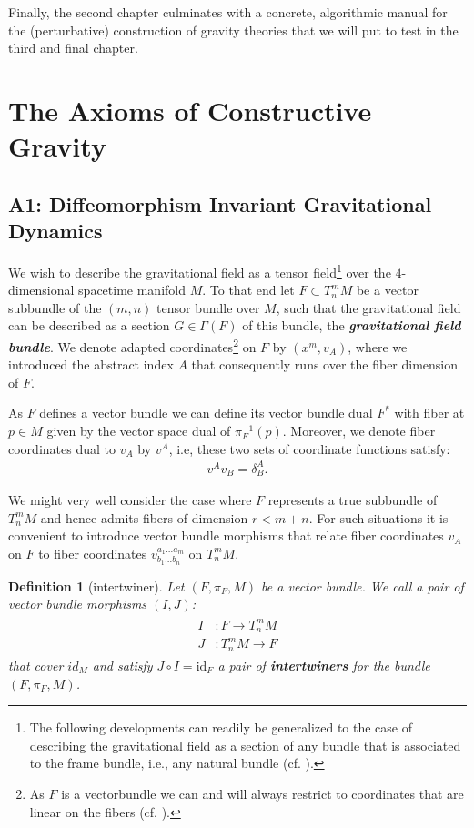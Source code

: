 \documentclass[%
 reprint,
nofootinbib,
 amsmath,amssymb,
 aps,
 prd,
floatfix,
]{revtex4-2}
\newtheorem{definition}{Definition}
\begin{document}
Finally, the second chapter culminates with a concrete, algorithmic manual for the (perturbative) construction of gravity theories that we will put to test in the third and final chapter.


\section{The Axioms of Constructive Gravity}\label{chapter1}
\subsection{A1: Diffeomorphism Invariant Gravitational Dynamics }

We wish to describe the gravitational field as a tensor field\footnote{The following developments can readily be generalized to the case of describing the gravitational field as a section of any bundle that is associated to the frame bundle, i.e., any natural bundle (cf. \cite{kolar1993natural}).} over the $4$-dimensional spacetime manifold $M$. To that end let $F \subset T^m_nM$ be a vector subbundle of the $(m,n)$ tensor bundle over $M$, such that the gravitational field can be described as a section $G \in \Gamma(F)$ of this bundle, the \textit{\textbf{gravitational field bundle}}. 
We denote adapted coordinates\footnote{As $F$ is a vectorbundle we can and will always restrict to coordinates that are linear on the fibers (cf. \cite{saunders_1989}).} on $F$ by $(x^m,v_A)$, where we introduced the abstract index $A$ that consequently runs over the fiber dimension of $F$.

As $F$ defines a vector bundle we can define its vector bundle dual $F^{\ast}$ with fiber at $p\in M$ given by the vector space dual of $\pi_F^{-1}(p)$.
Moreover, we denote fiber coordinates dual to $v_A$ by $v^A$, i.e, these two sets of coordinate functions satisfy:
\begin{align}
    v^Av_B = \delta^A_B.
\end{align}

We might very well consider the case where $F$ represents a true subbundle of $T^m_nM$ and hence admits fibers of dimension $r < m+n$. For such situations it is convenient to introduce vector bundle morphisms that relate fiber coordinates $v_A$ on $F$ to fiber coordinates $v^{a_1 ... a_m}_{b_1 ... b_n}$ on $T^m_nM$.

\begin{definition}[intertwiner]\label{interDef}
Let $(F,\pi_F,M)$ be a vector bundle. We call a pair of vector bundle morphisms $(I, J)$:
\begin{align}
    \begin{aligned}
    I&: F \longrightarrow T^m_n M\\
    J&: T^m_n M \longrightarrow F 
    \end{aligned}
\end{align}
that cover $id_M$ and satisfy
$J \circ I = \mathrm{id}_F$ a pair of \textbf{\textit{intertwiners}} for the bundle $(F, \pi_F, M)$.
\end{definition}
\end{document}
